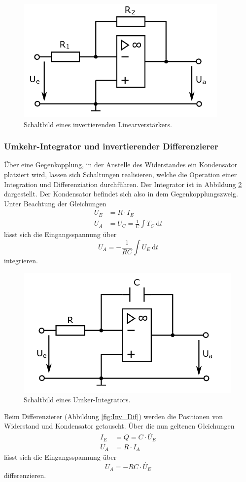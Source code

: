 \begin{figure}
    \centering 
    \includegraphics[width=.5\textwidth]{Bilder/Inv_Lin.png}
    \caption{Schaltbild eines invertierenden Linearverstärkers.}
    \label{fig:Inv_Lin}
\end{figure}

\subsubsection{Umkehr-Integrator und invertierender Differenzierer}

Über eine Gegenkopplung, in der Anstelle des Widerstandes ein Kondensator platziert wird, lassen sich Schaltungen realisieren, welche die Operation einer Integration und Differenziation durchführen.
Der Integrator ist in Abbildung \ref{fig:Um_Int} dargestellt.
Der Kondensator befindet sich also in dem Gegenkopplungszweig.
Unter Beachtung der Gleichungen
\begin{align*}
    U_E &= R \cdot I_E \\
    U_A &= U_C = \frac{1}{C}\int T_C \: \mathrm{d}t
\end{align*}
lässt sich die Eingangsspannung über
\begin{equation}
    U_A = -\frac{1}{RC} \int U_E \: \mathrm{d}t
\end{equation}
integrieren.




\begin{figure}
    \centering 
    \includegraphics[width=.5\textwidth]{Bilder/Um_Int.png}
    \caption{Schaltbild eines Umker-Integrators.}
    \label{fig:Um_Int}
\end{figure}

Beim Differenzierer (Abbildung \ref{fig:Inv_Dif}) werden die Positionen von Widerstand und Kondensator getauscht.
Über die nun geltenen Gleichungen
\begin{align*}
    I_E &= \dot{Q} = C \cdot \dot{U_E} \\
    U_A &= R\cdot I_A
\end{align*}
lässt sich die Eingangsspannung über
\begin{equation}
    U_A = -RC \cdot \dot{U_E}
\end{equation}
differenzieren.


